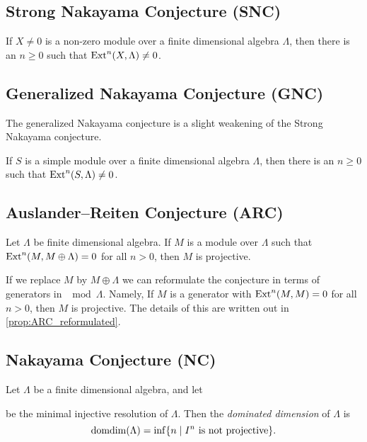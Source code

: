 \subsection*{Strong Nakayama Conjecture (SNC)}

\begin{conj} 
	If $X \neq 0$ is a non-zero module over a finite dimensional algebra $\Lambda$, then there is an $n \geq 0$ such that $\operatorname{Ext}^n(X,\Lambda) \neq 0$. 
\end{conj}

\subsection*{Generalized Nakayama Conjecture (GNC)}
The generalized Nakayama conjecture is a slight weakening of the Strong Nakayama conjecture.

\begin{conj} 
	If $S$ is a simple module over a finite dimensional algebra $\Lambda$, then there is an $n \geq 0$ such that $\operatorname{Ext}^n(S, \Lambda) \neq 0$. 
\end{conj}

\subsection*{Auslander--Reiten Conjecture (ARC)}

\begin{conj} 
	Let $\Lambda$ be  finite dimensional algebra. If $M$ is a module over $\Lambda$ such that  $\operatorname{Ext}^n(M, M \oplus \Lambda) = 0$ for all $n > 0$, then $M$ is projective. 
\end{conj}

If we replace $M$ by $M\oplus\Lambda$ we can reformulate the conjecture in terms of generators in $\mod\Lambda$. Namely, If $M$ is a generator with $\operatorname{Ext}^n(M,M)=0$ for all $n>0$, then $M$ is projective. The details of this are written out in \cref{prop:ARC_reformulated}.


\subsection*{Nakayama Conjecture (NC)}

\begin{defn}
	Let $\Lambda$ be a finite dimensional algebra, and let
	\begin{center}
	\end{center}
	be the minimal injective resolution of $\Lambda$. Then the \emph{dominated dimension} of $\Lambda$ is $$\operatorname{domdim}(\Lambda) = \inf\{n \; | \; I^n\text{ is not projective} \}.$$
\end{defn}

